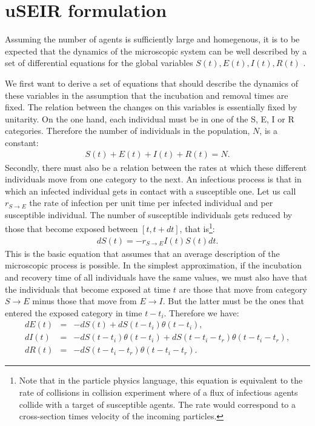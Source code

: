 \documentclass[a4paper,oneside,11pt]{article}
\begin{document}
\section{uSEIR formulation}
\label{sec:useir}
Assuming the number of agents is sufficiently large and homegenous, it is to be expected that the dynamics of the microscopic system can be well described by a set of differential equations for the global variables $S(t), E(t), I(t), R(t)$ \cite{Kermack1927}. 

We first want to derive a set of equations that should describe the dynamics of these variables in the assumption that the incubation and removal times are fixed. The relation between the changes on this variables is essentially fixed by unitarity. On the one hand, each individual must be in one of the S, E, I or R categories. Therefore the number of  individuals in the population, $N$, is a constant:
\begin{eqnarray}
S(t)+ E(t)+I(t)+R(t) = N.
\end{eqnarray}
Secondly, there must also be a relation between the rates at which these different individuals move from one category to the next. An infectious process is that in which an infected individual gets in contact with a susceptible one. Let us call $r_{S\rightarrow E}$ the rate of infection per unit time
per infected individual and per susceptible individual. The number of susceptible individuals gets reduced by those that become exposed between $[t, t+dt]$, that is\footnote{Note that in the particle physics language, this equation is equivalent to the rate of collisions in collision experiment where of a flux of infectious agents collide with a target of susceptible agents. The rate would correspond to a cross-section times velocity of the incoming particles.}:
\begin{eqnarray}
d S(t) = - r_{S\rightarrow E} I(t) S(t) dt.
\label{eq:basic}
\end{eqnarray}
This is the basic equation that assumes that an average description of the microscopic process is possible. 
In the simplest approximation, if the incubation and recovery time of all individuals have the same values, we must also have that the individuals that become exposed at time
$t$ are those that move from category $S\rightarrow E$  minus those that move from $E\rightarrow I$. But the latter must be the ones that entered the exposed category in time $t-t_i$. Therefore we have:
\begin{eqnarray}
d E(t) &=& -d S(t) + d S(t-t_i) \theta(t-t_i) ,\nonumber\\
d I(t) &=& -d S(t-t_i) \theta(t-t_i)+ d S(t-t_i-t_r) \theta(t-t_i-t_r),\nonumber\\
d R(t) &=& - d S(t - t_i - t_r) \theta(t-t_i-t_r).\nonumber
\label{eqs:cor}
\end{eqnarray}
\end{document}
